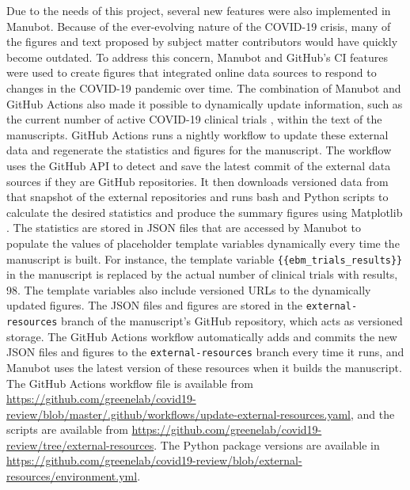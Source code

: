 \documentclass[sigconf]{acmart}
\begin{document}
Due to the needs of this project, several new features were also implemented in Manubot.
Because of the ever-evolving nature of the COVID-19 crisis, many of the figures and text proposed by subject matter contributors would have quickly become outdated.
To address this concern, Manubot and GitHub's CI features were used to create figures that integrated online data sources to respond to changes in the COVID-19 pandemic over time.
The combination of Manubot and GitHub Actions also made it possible to dynamically update information, such as the current number of active COVID-19 clinical trials \citep{cifK9B8t}, within the text of the manuscripts.
GitHub Actions runs a nightly workflow to update these external data and regenerate the statistics and figures for the manuscript.
The workflow uses the GitHub API to detect and save the latest commit of the external data sources if they are GitHub repositories.
It then downloads versioned data from that snapshot of the external repositories and runs bash and Python scripts to calculate the desired statistics and produce the summary figures using Matplotlib \citep{1026Gxdsi}.
The statistics are stored in JSON files that are accessed by Manubot to populate the values of placeholder template variables dynamically every time the manuscript is built.
For instance, the template variable \texttt{\{\{ebm\_trials\_results\}\}} in the manuscript is replaced by the actual number of clinical trials with results, 98.
The template variables also include versioned URLs to the dynamically updated figures.
The JSON files and figures are stored in the \texttt{external-resources} branch of the manuscript's GitHub repository, which acts as versioned storage.
The GitHub Actions workflow automatically adds and commits the new JSON files and figures to the \texttt{external-resources} branch every time it runs, and Manubot uses the latest version of these resources when it builds the manuscript.
The GitHub Actions workflow file is available from \url{https://github.com/greenelab/covid19-review/blob/master/.github/workflows/update-external-resources.yaml}, and the scripts are available from \url{https://github.com/greenelab/covid19-review/tree/external-resources}.
The Python package versions are available in \url{https://github.com/greenelab/covid19-review/blob/external-resources/environment.yml}.
\end{document}
